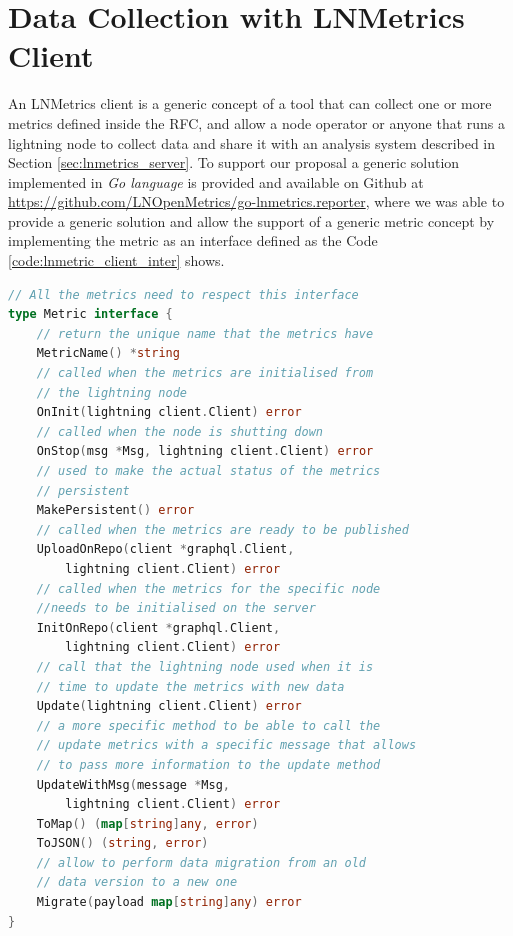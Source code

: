 \section{Data Collection with LNMetrics Client}
\label{sec:lnmetrics_client}

An LNMetrics client is a generic concept of a tool that can collect one or more metrics 
defined inside the RFC, and allow a node operator or anyone that runs a lightning node
to collect data and share it with an analysis system described in Section \ref{sec:lnmetrics_server}.
To support our proposal a generic solution implemented in \emph{Go language} is provided 
and available on Github at \url{https://github.com/LNOpenMetrics/go-lnmetrics.reporter}, where we was able 
to provide a generic solution and allow the support of a generic metric concept 
by implementing the metric as an interface defined as the Code \ref{code:lnmetric_client_inter} shows.

\begin{lstlisting}[language=go, basicstyle=\small,
                  caption={Metric interface provided in our client reference implementation.}, 
                  label={code:lnmetric_client_inter}]
// All the metrics need to respect this interface
type Metric interface {
    // return the unique name that the metrics have
    MetricName() *string
    // called when the metrics are initialised from 
    // the lightning node
    OnInit(lightning client.Client) error
    // called when the node is shutting down
    OnStop(msg *Msg, lightning client.Client) error
    // used to make the actual status of the metrics
    // persistent
    MakePersistent() error
    // called when the metrics are ready to be published
    UploadOnRepo(client *graphql.Client, 
        lightning client.Client) error
    // called when the metrics for the specific node 
    //needs to be initialised on the server
    InitOnRepo(client *graphql.Client, 
        lightning client.Client) error
    // call that the lightning node used when it is 
    // time to update the metrics with new data
    Update(lightning client.Client) error
    // a more specific method to be able to call the 
    // update metrics with a specific message that allows 
    // to pass more information to the update method
    UpdateWithMsg(message *Msg, 
        lightning client.Client) error
    ToMap() (map[string]any, error)
    ToJSON() (string, error)
    // allow to perform data migration from an old 
    // data version to a new one
    Migrate(payload map[string]any) error
}
\end{lstlisting}


